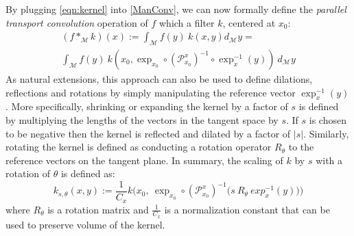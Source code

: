 \documentclass[10pt,twocolumn,letterpaper]{article}
\def\M{\mathcal{M}}
\def\PT{\mathcal{P}}
\begin{document}
By plugging \eqref{eqn:kernel} into \eqref{ManConv}, we can now formally define the {\it parallel transport convolution} operation of $f$ which a filter $k$, centered at $x_0$:
\begin{equation}
\begin{split}\label{ManConvRot}
(f *_{\M} k) (x) := \int_{\M} f(y)~k(x,y) d_\M y =  \\
\int_{\M} f(y) ~k\left(x_0, \exp_{x_0}\circ (\PT_{x_0}^{x})^{-1}\circ \exp_x^{-1}(y)\right) \ d_{\M}y
\end{split}
\end{equation}
As natural extensions, this approach can also be used to define dilations, reflections and rotations by simply manipulating the reference vector $\exp^{-1}_{x}(y)$. More specifically, shrinking or expanding the kernel by a factor of $s$ is defined by multiplying the lengths of the vectors in the tangent space by $s$. If $s$ is chosen to be negative then the kernel is reflected and dilated by a factor of $|s|$. Similarly, rotating the kernel is defined as conducting a rotation operator $R_{\theta}$ to the reference vectors on the tangent plane. In summary, the scaling of $k$ by $s$ with a rotation of $\theta$ is defined as:
\begin{equation}\label{RotandDil}
k_{s,\theta}(x,y) := \frac{1}{C_{x}} k\Big(x_0,\ \exp_{x_0}\circ (\PT_{x_0}^{x})^{-1}(s\  R_{\theta} \ exp^{-1}_{x}(y)\big)\Big)
\end{equation}
where $R_\theta$ is a rotation matrix and $\displaystyle \frac{1}{C_{x}}$ is a normalization constant that can be used to preserve volume of the kernel.
\end{document}
